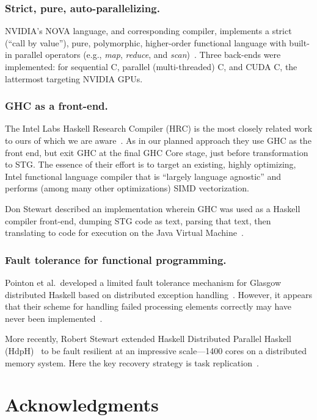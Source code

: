\documentclass{llncs}
\begin{document}
\subsubsection{Strict, pure, auto-parallelizing.}
NVIDIA's NOVA language, and corresponding compiler, implements a strict
(``call by value''), pure, polymorphic, higher-order functional language with
built-in parallel operators (e.g., \emph{map}, \emph{reduce}, and
\emph{scan})~\cite{NVIDIA:2013}. Three back-ends were implemented: for
sequential C, parallel (multi-threaded) C, and CUDA C, the lattermost
targeting NVIDIA GPUs.

\subsubsection{GHC as a front-end.}
The Intel Labs Haskell Research Compiler (HRC) is the most closely related
work to ours of which we are aware~\cite{Liu:2013,Petersen:2013}.  As in our
planned approach they use GHC as the front end, but exit GHC at the final GHC
Core stage, just before transformation to STG.  The essence of their effort is
to target an existing, highly optimizing, Intel functional language compiler
that is ``largely language agnostic'' and performs (among many other
optimizations) SIMD vectorization.

Don Stewart described an implementation wherein GHC was used as a Haskell compiler
front-end, dumping STG code as text, parsing that text, then translating to
code for execution on the Java Virtual Machine~\cite{Stewart-BSc}.

\subsubsection{Fault tolerance for functional programming.}
Pointon et al.\ developed a limited fault tolerance mechanism for Glasgow
distributed Haskell based on distributed exception
handling~\cite{Pointon:2001}.  However, it appears that their scheme for
handling failed processing elements correctly may have
never been implemented~\cite{Trinder:2000}.

More recently, Robert Stewart extended Haskell Distributed Parallel Haskell
(HdpH)~\cite{hdph} to be fault resilient at an impressive scale---1400 cores
on a distributed memory system.  Here the key recovery strategy is task
replication~\cite{Stewart:2013}.

\section{Acknowledgments}
\end{document}
